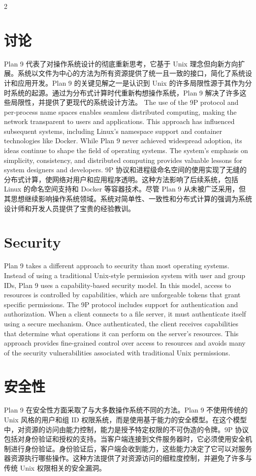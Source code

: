 \documentclass{article}
\begin{document}
\begin{paracol}{2}
\section*{讨论}
Plan 9 代表了对操作系统设计的彻底重新思考，它基于 Unix 理念但向新方向扩展。系统以文件为中心的方法为所有资源提供了统一且一致的接口，简化了系统设计和应用开发。Plan 9 的关键见解之一是认识到 Unix 的许多局限性源于其作为分时系统的起源。通过为分布式计算时代重新构想操作系统，Plan 9 解决了许多这些局限性，并提供了更现代的系统设计方法。
\switchcolumn*
The use of the 9P protocol and per-process name spaces enables seamless distributed computing, making the network transparent to users and applications. This approach has influenced subsequent systems, including Linux's namespace support and container technologies like Docker. While Plan 9 never achieved widespread adoption, its ideas continue to shape the field of operating systems. The system's emphasis on simplicity, consistency, and distributed computing provides valuable lessons for system designers and developers.
\switchcolumn
9P 协议和进程级命名空间的使用实现了无缝的分布式计算，使网络对用户和应用程序透明。这种方法影响了后续系统，包括 Linux 的命名空间支持和 Docker 等容器技术。尽管 Plan 9 从未被广泛采用，但其思想继续影响操作系统领域。系统对简单性、一致性和分布式计算的强调为系统设计师和开发人员提供了宝贵的经验教训。
\switchcolumn*
\section*{Security}
Plan 9 takes a different approach to security than most operating systems. Instead of using a traditional Unix-style permission system with user and group IDs, Plan 9 uses a capability-based security model. In this model, access to resources is controlled by capabilities, which are unforgeable tokens that grant specific permissions. The 9P protocol includes support for authentication and authorization. When a client connects to a file server, it must authenticate itself using a secure mechanism. Once authenticated, the client receives capabilities that determine what operations it can perform on the server's resources. This approach provides fine-grained control over access to resources and avoids many of the security vulnerabilities associated with traditional Unix permissions.
\switchcolumn
\section*{安全性}
Plan 9 在安全性方面采取了与大多数操作系统不同的方法。Plan 9 不使用传统的 Unix 风格的用户和组 ID 权限系统，而是使用基于能力的安全模型。在这个模型中，对资源的访问由能力控制，能力是授予特定权限的不可伪造的令牌。9P 协议包括对身份验证和授权的支持。当客户端连接到文件服务器时，它必须使用安全机制进行身份验证。身份验证后，客户端会收到能力，这些能力决定了它可以对服务器资源执行哪些操作。这种方法提供了对资源访问的细粒度控制，并避免了许多与传统 Unix 权限相关的安全漏洞。
\switchcolumn*

\end{paracol}
\end{document}
